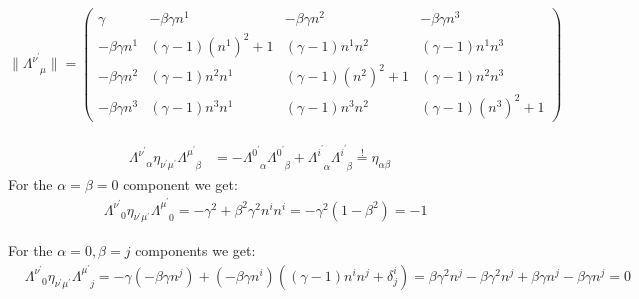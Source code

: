 \begin{widetext}
	\subsubsection{ }\label{sususec:exe-2-7} 
	\begin{equation} 
		\label{eq:exe-2-7-general-trafo}
		\|\Lambda^{\nu^\prime}_{\phantom{\nu^\prime}\mu}\|=\left(
		\begin{array}{cccc}
			\gamma & -\beta\gamma n^1 & -\beta\gamma n^2 & -\beta\gamma n^3 \\
			-\beta\gamma n^1 & (\gamma-1)\left(n^1\right)^2+1 & (\gamma-1)n^1n^2 & (\gamma-1)n^1n^3 \\
			-\beta\gamma n^2 & (\gamma-1)n^2n^1 & (\gamma-1)\left(n^2\right)^2+1 & (\gamma-1)n^2n^3 \\
			-\beta\gamma n^3 & (\gamma-1)n^3n^1 & (\gamma-1)n^3n^2 & (\gamma-1)\left(n^3\right)^2+1
		\end{array}
		\right)
	\end{equation}
	\paragraph{\phantom{,}}
	\begin{align*} 
		\Lambda^{\nu^\prime}_{\phantom{\nu^\prime}\alpha}\eta_{\nu^\prime\mu^\prime}\Lambda^{\mu^\prime}_{\phantom{\mu^\prime}\beta}&=
		-\Lambda^{0^\prime}_{\phantom{0^\prime}\alpha}\Lambda^{0^\prime}_{\phantom{0^\prime}\beta}+\Lambda^{i^\prime}_{\phantom{i^\prime}\alpha}\Lambda^{i^\prime}_{\phantom{i^\prime}\beta}\overset{!}{=}\eta_{\alpha\beta}
	\end{align*}
	For the $\alpha=\beta=0$ component we get:
	\begin{align*} 
		&\Lambda^{\nu^\prime}_{\phantom{\nu^\prime}0}\eta_{\nu^\prime\mu^\prime}\Lambda^{\mu^\prime}_{\phantom{\mu^\prime}0}
		=-\gamma^2+\beta^2\gamma^2n^in^i
		=-\gamma^2\left(1-\beta^2\right)=-1
	\end{align*}
	
	For the $\alpha=0, \beta=j$ components we get:
	\begin{align*} 
		&\Lambda^{\nu^\prime}_{\phantom{\nu^\prime}0}\eta_{\nu^\prime\mu^\prime}\Lambda^{\mu^\prime}_{\phantom{\mu^\prime}j}
		=-\gamma\left(-\beta\gamma n^j\right)+\left(-\beta\gamma n^i\right)\left((\gamma-1)n^in^j+\delta^i_j\right)
		=\beta\gamma^2 n^j-\beta\gamma^2 n^j+\beta\gamma n^j-\beta\gamma n^j=0
	\end{align*}
	

\end{widetext}
